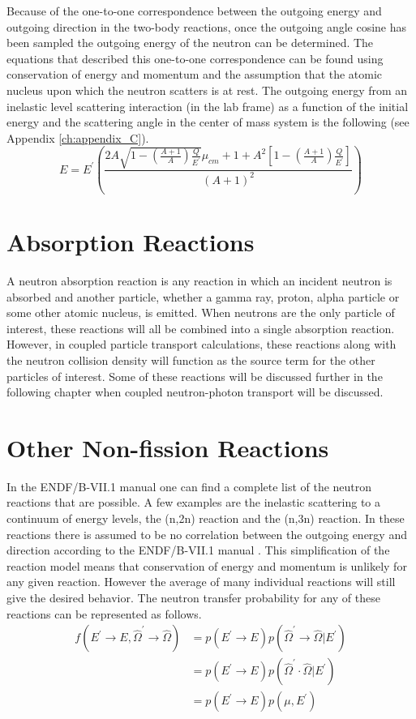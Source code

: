 Because of the one-to-one correspondence between the outgoing energy and
outgoing direction in the two-body reactions, once the outgoing angle cosine
has been sampled the outgoing energy of the neutron can be determined. The
equations that described this one-to-one correspondence can be found using
conservation of energy and momentum and the assumption that the atomic nucleus
upon which the neutron scatters is at rest. The outgoing energy from an 
inelastic level scattering interaction (in the lab frame) as a function of the 
initial energy and the scattering angle in the center of mass system is the 
following (see Appendix \ref{ch:appendix_C}).
\begin{equation}
  E = E^{'} \left(\frac{2A\sqrt{1 - \left(\frac{A+1}{A}\right)\frac{Q}{E^{'}}}
    \mu_{cm} + 1 + A^2\left[1-\left(\frac{A+1}{A}\right)\frac{Q}{E^{'}}
      \right]}{\left(A+1\right)^2}\right) 
\end{equation}

\section{Absorption Reactions}
A neutron absorption reaction is any reaction in which an incident neutron is
absorbed and another particle, whether a gamma ray, proton, alpha particle or
some other atomic nucleus, is emitted. When neutrons are the only particle of
interest, these reactions will all be combined into a single absorption
reaction. However, in coupled particle transport calculations, these reactions
along with the neutron collision density will function as the source term for
the other particles of interest. Some of these reactions will be discussed 
further in the following chapter when coupled neutron-photon transport will
be discussed. 

\section{Other Non-fission Reactions}
In the ENDF/B-VII.1 manual one can find a complete list of the neutron reactions
that are possible. A few examples are the inelastic scattering to 
a continuum of energy levels, the (n,2n) reaction and the (n,3n) reaction. In
these reactions there is assumed to be no correlation between the outgoing
energy and direction according to the ENDF/B-VII.1 manual 
\citep{chadwick_endf/b-vii.1_2011}. This simplification of the reaction model 
means that conservation of energy and momentum is unlikely for any given 
reaction. However the average of many individual reactions will still give the 
desired behavior. The neutron transfer probability for any of these reactions
can be represented as follows.
\begin{align}
  f(E^{'} \to E,\hat{\Omega}^{'} \to \hat{\Omega}) & = p(E^{'} \to E)
  p(\hat{\Omega}^{'} \to \hat{\Omega} | E^{'}) \nonumber \\
  & = p(E^{'} \to E)p(\hat{\Omega}^{'}\cdot\hat{\Omega} | E^{'}) \nonumber \\
  & = p(E^{'} \to E)p(\mu,E^{'})
\end{align}

